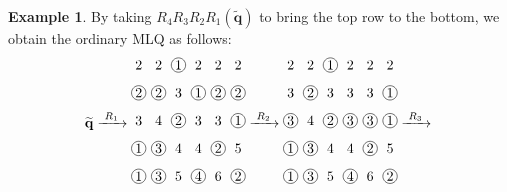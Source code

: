 \documentclass[reqno]{amsart}
\newcommand{\0}{\phantom{c}}
\newcommand{\qq}{\mathbf{q}}
\theoremstyle{plain}
\theoremstyle{definition}
\newtheorem{example}[thm]{Example}
\numberwithin{equation}{section}
\begin{document}
\begin{example}
By taking $R_4 R_3 R_2 R_1(\widetilde{\qq})$ to bring the top row to the bottom, we obtain the ordinary MLQ as follows:
\[
\widetilde{\qq} \xrightarrow[\hspace{15pt}]{R_1}
\begin{tikzpicture}[xscale=0.5,yscale=0.7,every node/.style={inner sep=0.8pt},baseline=55]
\node at (0, 5){2};\node at (1, 5){2};\node[circle, draw=black] at (2, 5){1};\node at (3, 5){2};\node at (4, 5){2};\node at (5, 5){2};\node[circle, draw=black] at (0, 4){2};\node[circle, draw=black] at (1, 4){2};\node at (2, 4){3};\node[circle, draw=black] at (3, 4){1};\node[circle, draw=black] at (4, 4){2};\node[circle, draw=black] at (5, 4){2};\node at (0, 3){3};\node at (1, 3){4};\node[circle, draw=black] at (2, 3){2};\node at (3, 3){3};\node at (4, 3){3};\node[circle, draw=black] at (5, 3){1};\node[circle, draw=black] at (0, 2){1};\node[circle, draw=black] at (1, 2){3};\node at (2, 2){4};\node at (3, 2){4};\node[circle, draw=black] at (4, 2){2};\node at (5, 2){5};\node[circle, draw=black] at (0, 1){1};\node[circle, draw=black] at (1, 1){3};\node at (2, 1){5};\node[circle, draw=black] at (3, 1){4};\node at (4, 1){6};\node[circle, draw=black] at (5, 1){2};
\end{tikzpicture}
\xrightarrow[\hspace{15pt}]{R_2}
\begin{tikzpicture}[xscale=0.5,yscale=0.7,every node/.style={inner sep=0.8pt},baseline=55]
\node at (0, 5){2};\node at (1, 5){2};\node[circle, draw=black] at (2, 5){1};\node at (3, 5){2};\node at (4, 5){2};\node at (5, 5){2};\node at (0, 4){3};\node[circle, draw=black] at (1, 4){2};\node at (2, 4){3};\node at (3, 4){3};\node at (4, 4){3};\node[circle, draw=black] at (5, 4){1};\node[circle, draw=black] at (0, 3){3};\node at (1, 3){4};\node[circle, draw=black] at (2, 3){2};\node[circle, draw=black] at (3, 3){3};\node[circle, draw=black] at (4, 3){3};\node[circle, draw=black] at (5, 3){1};\node[circle, draw=black] at (0, 2){1};\node[circle, draw=black] at (1, 2){3};\node at (2, 2){4};\node at (3, 2){4};\node[circle, draw=black] at (4, 2){2};\node at (5, 2){5};\node[circle, draw=black] at (0, 1){1};\node[circle, draw=black] at (1, 1){3};\node at (2, 1){5};\node[circle, draw=black] at (3, 1){4};\node at (4, 1){6};\node[circle, draw=black] at (5, 1){2};
\end{tikzpicture}
\xrightarrow[\hspace{15pt}]{R_3}
\begin{tikzpicture}[xscale=0.5,yscale=0.7,every node/.style={inner sep=0.8pt},baseline=55]

\end{tikzpicture}\]
\end{example}
\end{document}
